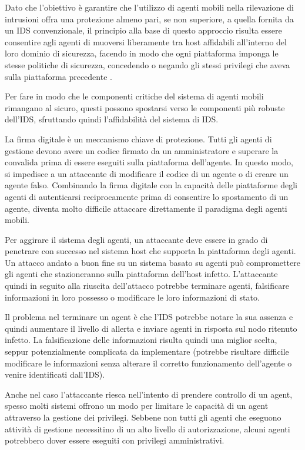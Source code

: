 Dato che l'obiettivo è garantire che l'utilizzo di agenti mobili nella rilevazione di intrusioni offra una protezione almeno pari, se non superiore, a quella fornita da un IDS convenzionale, il principio alla base di questo approccio risulta essere consentire agli agenti di muoversi liberamente tra host affidabili all'interno del loro dominio di sicurezza, facendo in modo che ogni piattaforma imponga le stesse politiche di sicurezza, concedendo o negando gli stessi privilegi che aveva sulla piattaforma precedente \cite{jansen2002intrusion}.

Per fare in modo che le componenti critiche del sistema di agenti mobili rimangano al sicuro, questi possono spostarsi verso le componenti più robuste dell'IDS, sfruttando quindi l'affidabilità del sistema di IDS.

\smallskip

La firma digitale è un meccanismo chiave di protezione. Tutti gli agenti di gestione devono avere un codice firmato da un amministratore e superare la convalida prima di essere eseguiti sulla piattaforma dell'agente. In questo modo, si impedisce a un attaccante di modificare il codice di un agente o di creare un agente falso. Combinando la firma digitale con la capacità delle piattaforme degli agenti di autenticarsi reciprocamente prima di consentire lo spostamento di un agente, diventa molto difficile attaccare direttamente il paradigma degli agenti mobili.

\smallskip

Per aggirare il sistema degli agenti, un attaccante deve essere in grado di penetrare con successo nel sistema host che supporta la piattaforma degli agenti. Un attacco andato a buon fine su un sistema basato su agenti può compromettere gli agenti che stazioneranno sulla piattaforma dell'host infetto. L'attaccante quindi in seguito alla riuscita dell'attacco potrebbe terminare agenti, falsificare informazioni in loro possesso o modificare le loro informazioni di stato.


Il problema nel terminare un agent è che l'IDS potrebbe notare la sua assenza e quindi aumentare il livello di allerta e  inviare agenti in risposta sul nodo ritenuto infetto. La falsificazione delle informazioni risulta quindi una miglior scelta, seppur potenzialmente complicata da implementare (potrebbe risultare difficile modificare le informazioni senza alterare il corretto funzionamento dell'agente o venire identificati dall'IDS).

Anche nel caso l'attaccante riesca nell'intento di prendere controllo di un agent, spesso molti sistemi offrono un modo per limitare le capacità di un agent attraverso la gestione dei privilegi. Sebbene non tutti gli agenti che eseguono attività di gestione necessitino di un alto livello di autorizzazione, alcuni agenti potrebbero dover essere eseguiti con privilegi amministrativi.

